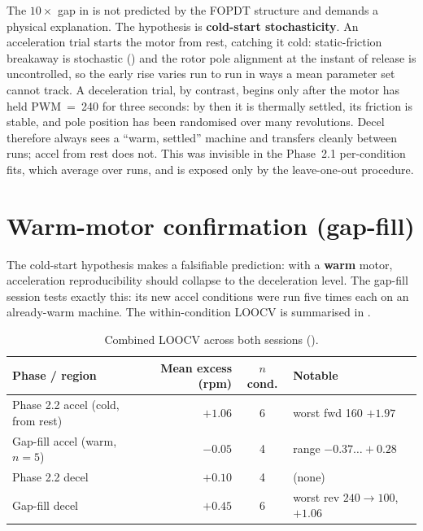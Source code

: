 The $10\times$ gap in  is not predicted by the FOPDT structure and demands a physical explanation. The hypothesis is \textbf{cold-start stochasticity}. An acceleration trial starts the motor from rest, catching it cold: static-friction breakaway is stochastic () and the rotor pole alignment at the instant of release is uncontrolled, so the early rise varies run to run in ways a mean parameter set cannot track. A deceleration trial, by contrast, begins only after the motor has held PWM~=~240 for three seconds: by then it is thermally settled, its friction is stable, and pole position has been randomised over many revolutions. Decel therefore always sees a ``warm, settled'' machine and transfers cleanly between runs; accel from rest does not. This was invisible in the Phase~2.1 per-condition fits, which average over runs, and is exposed only by the leave-one-out procedure.

\section{Warm-motor confirmation (gap-fill)}
\label{sec:warm}

The cold-start hypothesis makes a falsifiable prediction: with a \textbf{warm} motor, acceleration reproducibility should collapse to the deceleration level. The gap-fill session tests exactly this: its new accel conditions were run five times each on an already-warm machine. The within-condition LOOCV is summarised in .

\begin{table}[t]
  \centering
  \caption{Combined LOOCV across both sessions ().}
  \label{tab:loocv_combined}
  \small
  \begin{tabular}{@{}p{5.2cm}rcp{3.4cm}@{}}
    \toprule
    Phase / region & Mean excess (rpm) & $n$ cond. & Notable \\
    \midrule
    Phase 2.2 accel (cold, from rest) & $+1.06$ & 6 & worst fwd 160 $+1.97$ \\
    Gap-fill accel (warm, $n{=}5$) & \boldmath$-0.05$ & 4 & range $-0.37 \ldots +0.28$ \\
    Phase 2.2 decel & $+0.10$ & 4 & (none) \\
    Gap-fill decel & $+0.45$ & 6 & worst rev $240\to100$, $+1.06$ \\
    \bottomrule
  \end{tabular}
\end{table}

